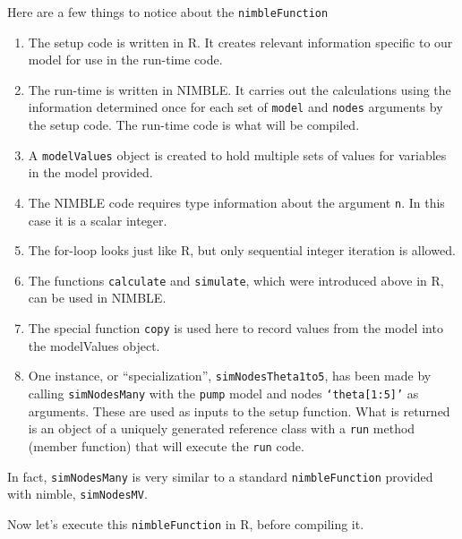 \documentclass[12pt,oneside]{book}\usepackage[]{graphicx}\usepackage[]{color}
\def\cd#1{\texttt{#1}}
\begin{document}
Here are a few things to notice about the \cd{nimbleFunction}
\begin{enumerate}
\item The setup code is written in R.  It creates relevant
information specific to our model for use in the run-time code.  
\item The run-time is written in NIMBLE.  It carries out the
  calculations using the information determined once for each set of
  \cd{model} and \cd{nodes} arguments by the setup
  code. The run-time code is what will be compiled.
\item A \cd{modelValues} object is created to hold multiple sets of
  values for variables
  in the model provided.
\item The NIMBLE code requires type information about the argument
  \cd{n}.  In this case it is a scalar integer.  
\item The for-loop looks just like R, but only sequential integer
  iteration is allowed.
\item The functions \cd{calculate} and \cd{simulate}, which were
  introduced above in R, can be used in NIMBLE.
\item The special function \cd{copy} is used here to record values
  from the model into the modelValues object.  
\item One instance, or ``specialization'', \cd{simNodesTheta1to5}, has
  been made by calling \cd{simNodesMany} with the \cd{pump} model and
  nodes \cd{`theta[1:5]'} as arguments.  These are used as inputs to
  the setup function.  What is returned is an object of a uniquely
  generated reference class with a \cd{run} method (member function)
  that will execute the \cd{run} code.
\end{enumerate}

In fact, \cd{simNodesMany} is very similar to a standard
\cd{nimbleFunction} provided with nimble, \cd{simNodesMV}.

Now let's execute this \cd{nimbleFunction} in R, before compiling it.
\end{document}

